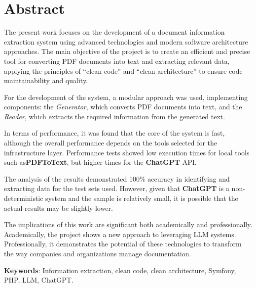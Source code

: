 \newpage
\section*{Abstract}
The present work focuses on the development of a document information extraction system using advanced technologies and
modern software architecture approaches.
The main objective of the project is to create an efficient and precise tool for converting PDF documents into text and
extracting relevant data, applying the principles of ``clean code'' and ``clean architecture'' to ensure code
maintainability and quality.

For the development of the system, a modular approach was used, implementing components: the \textit{Generator}, which
converts PDF documents into text, and the \textit{Reader}, which extracts the required information from the generated
text.

In terms of performance, it was found that the core of the system is fast, although the overall performance depends on
the tools selected for the infrastructure layer.
Performance tests showed low execution times for local tools such as\textbf{PDFToText}, but higher times for the
\textbf{ChatGPT} API.

The analysis of the results demonstrated 100\% accuracy in identifying and extracting data for the test sets used.
However, given that \textbf{ChatGPT} is a non-deterministic system and the sample is relatively small, it is
possible that the actual results may be slightly lower.

The implications of this work are significant both academically and professionally.
Academically, the project shows a new approach to leveraging LLM systems.
Professionally, it demonstrates the potential of these technologies to transform the way companies and organizations
manage documentation.

\vspace{1cm}

\textbf{Keywords}: Information extraction, clean code, clean architecture, Symfony, PHP, LLM, ChatGPT.


